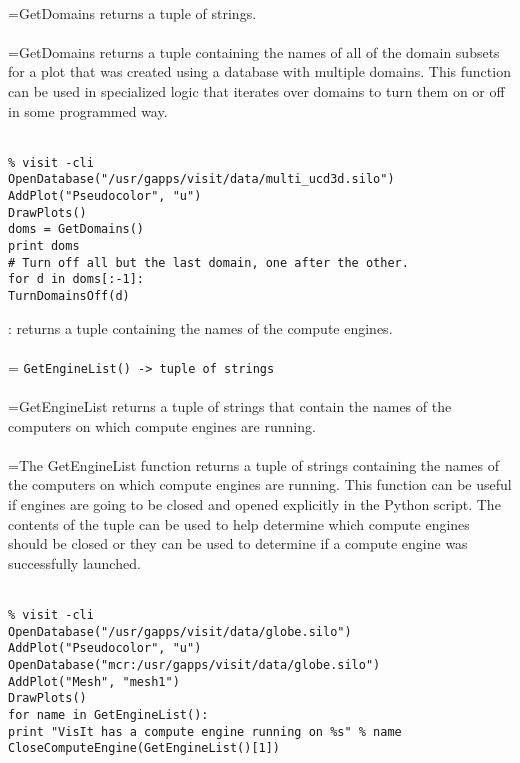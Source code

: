 \documentclass[10pt,a4paper]{report}
\begin{document}
 \\ 
\hangindent=\parindent GetDomains returns a tuple of strings. \\[-3mm] 

 \\ 
\hangindent=\parindent GetDomains returns a tuple containing the names of all of the domain subsets for a plot that was created using a database with multiple domains. This function can be used in specialized logic that iterates over domains to turn them on or off in some programmed way. \\[-3mm] 

\\[-6mm]
\begin{verbatim}% visit -cli
OpenDatabase("/usr/gapps/visit/data/multi_ucd3d.silo")
AddPlot("Pseudocolor", "u")
DrawPlots()
doms = GetDomains()
print doms
# Turn off all but the last domain, one after the other.
for d in doms[:-1]:
TurnDomainsOff(d)
\end{verbatim}
\newpage


{}
: returns a tuple containing the names of the compute engines.\\[-3mm]

 \\ 
\hangindent=\parindent 
\verb!GetEngineList() -> tuple of strings!\\ [-3mm]

 \\ 
\hangindent=\parindent GetEngineList returns a tuple of strings that contain the names of the computers on which compute engines are running. \\[-3mm] 

 \\ 
\hangindent=\parindent The GetEngineList function returns a tuple of strings containing the names of the computers on which compute engines are running. This function can be useful if engines are going to be closed and opened explicitly in the Python script. The contents of the tuple can be used to help determine which compute engines should be closed or they can be used to determine if a compute engine was successfully launched. \\[-3mm] 

\\[-6mm]
\begin{verbatim}% visit -cli
OpenDatabase("/usr/gapps/visit/data/globe.silo")
AddPlot("Pseudocolor", "u")
OpenDatabase("mcr:/usr/gapps/visit/data/globe.silo")
AddPlot("Mesh", "mesh1")
DrawPlots()
for name in GetEngineList():
print "VisIt has a compute engine running on %s" % name
CloseComputeEngine(GetEngineList()[1])
\end{verbatim}
\newpage
\end{document}

